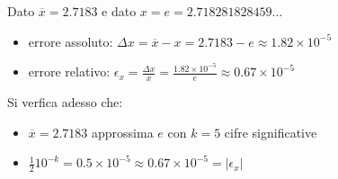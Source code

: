 Dato \(\overline{x} = 2.7183\) e dato \(x = e = 2.718281828459\ldots \)

\begin{itemize}

\item errore assoluto: \(\Delta x = \overline{x} - x = 2.7183 - e \approx 1.82 \times 10^{-5}\)
\item errore relativo: \(\epsilon_x = \frac{\Delta x}{x} = \frac{ 1.82 \times 10^{-5}}{e} \approx 0.67 \times 10^{-5}\)

\end{itemize}

\noindent Si verfica adesso che:

\begin{itemize}
\item \(\overline{x} = 2.7183\) approssima \(e\) con \(k=5\) cifre significative
\item \( \frac{1}{2}10^{-k} = 0.5 \times 10^{-5} \approx 0.67 \times 10^{-5} = |\epsilon_x|\)
\end{itemize}

